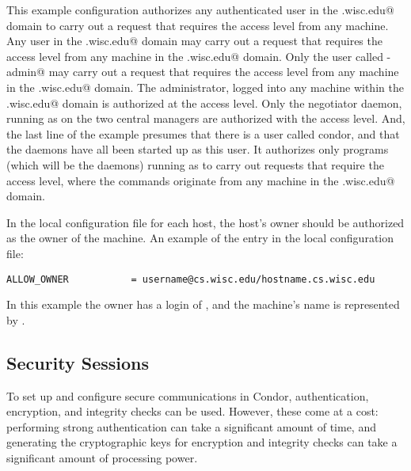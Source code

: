 This example configuration authorizes
any authenticated user in the 
\verb@cs.wisc.edu@ domain to 
carry out a request that requires the 
 access level
from any machine.
Any user in the 
\verb@cs.wisc.edu@ domain may 
carry out a request that requires the 
 access level
from any machine in the
\verb@cs.wisc.edu@ domain.
Only the user called \verb@condor-admin@ may 
carry out a request that requires the 
 access level
from any machine in the
\verb@cs.wisc.edu@ domain.
The administrator, logged into any machine within
the \verb@cs.wisc.edu@ domain is authorized at the
 access level.
Only the negotiator daemon, running as
\verb@condor@ on the two central managers
are authorized 
with the
 access level.
And, the last line of the example presumes that there is a
user called condor, and that the daemons have all been started
up as this user.
It authorizes only programs (which will be the daemons)
running as 
\verb@condor@ to
carry out requests that require the 
 access level,
where the commands originate from
any machine in the
\verb@cs.wisc.edu@ domain.

In the local configuration file for each host, the host's
owner should be authorized
as the owner of the machine.
An example of the entry in the local configuration file:
\footnotesize
\begin{verbatim}
ALLOW_OWNER           = username@cs.wisc.edu/hostname.cs.wisc.edu
\end{verbatim}
\normalsize
In this example the owner has a login of
\verb@username@, and the machine's name is represented by
\verb@hostname@.



\subsection{\label{sec:Security-Sessions}Security Sessions}

To set up and configure secure communications in Condor,
authentication, encryption, and integrity checks can be used.  
However, these come at a cost: performing strong authentication can
take a significant amount of time, and  generating the cryptographic
keys for encryption and integrity checks can take a significant amount
of processing power. 

